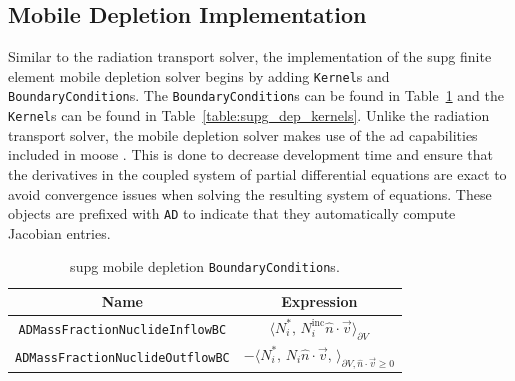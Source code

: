\subsection{Mobile Depletion Implementation}
\label{solver:implementation:mobile_depletion}

Similar to the radiation transport solver, the implementation of the \acrshort{supg} finite element mobile depletion solver begins by adding \texttt{Kernel}s and \texttt{BoundaryCondition}s. The \texttt{BoundaryCondition}s can be found in Table~\ref{table:supg_dep_bc} and the \texttt{Kernel}s can be found in Table~\ref{table:supg_dep_kernels}. Unlike the radiation transport solver, the mobile depletion solver makes use of the \acrshort{ad} capabilities included in \acrshort{moose} \cite{moose_ad}. This is done to decrease development time and ensure that the derivatives in the coupled system of partial differential equations are exact to avoid convergence issues when solving the resulting system of equations. These objects are prefixed with \texttt{AD} to indicate that they automatically compute Jacobian entries. 
\begin{table}[H]
    \centering
    \caption{\acrshort{supg} mobile depletion \texttt{BoundaryCondition}s.}
    \begin{tabular}{|c|c|}
        \hline
        \textbf{Name} & \textbf{Expression}\\
        \hline
        \texttt{ADMassFractionNuclideInflowBC} & $\Bigg\langle N^{*}_{i},\,N_{i}^{\text{inc}}\hat{n}\cdot\vec{v}\Bigg\rangle_{\partial V}$ \\
        \texttt{ADMassFractionNuclideOutflowBC} & $-\Bigg\langle N^{*}_{i},\,N_{i}\hat{n}\cdot\vec{v},\,\Bigg\rangle_{\partial V, \hat{n}\cdot\vec{v}\geq0}$ \\
        \hline
    \end{tabular}
    \label{table:supg_dep_bc}
\end{table}
